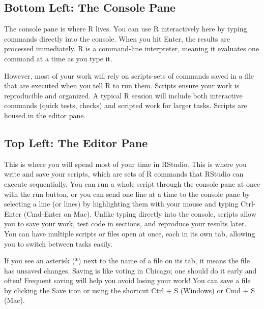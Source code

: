 \documentclass[
  letterpaper,
]{book}
\begin{document}
\subsection{Bottom Left: The Console
Pane}\label{bottom-left-the-console-pane}

The console pane is where R lives. You can use R interactively here by
typing commands directly into the console. When you hit Enter, the
results are processed immediately. R is a command-line interpreter,
meaning it evaluates one command at a time as you type it.

However, most of your work will rely on scripts-sets of commands saved
in a file that are executed when you tell R to run them. Scripts ensure
your work is reproducible and organized. A typical R session will
include both interactive commands (quick tests, checks) and scripted
work for larger tasks. Scripts are housed in the editor pane.

\subsection{Top Left: The Editor Pane}\label{top-left-the-editor-pane}

This is where you will spend most of your time in RStudio. This is where
you write and save your scripts, which are sets of R commands that
RStudio can execute sequentially. You can run a whole script through the
console pane at once with the run button, or you can send one line at a
time to the console pane by selecting a line (or lines) by highlighting
them with your mouse and typing Ctrl-Enter (Cmd-Enter on Mac). Unlike
typing directly into the console, scripts allow you to save your work,
test code in sections, and reproduce your results later. You can have
multiple scripts or files open at once, each in its own tab, allowing
you to switch between tasks easily.

\begin{tcolorbox}[enhanced jigsaw, colframe=quarto-callout-tip-color-frame, breakable, arc=.35mm, bottomtitle=1mm, bottomrule=.15mm, colbacktitle=quarto-callout-tip-color!10!white, rightrule=.15mm, colback=white, opacityback=0, opacitybacktitle=0.6, coltitle=black, left=2mm, toptitle=1mm, toprule=.15mm, titlerule=0mm, leftrule=.75mm, title=\textcolor{quarto-callout-tip-color}{\faLightbulb}\hspace{0.5em}{Tip from the Helpdesk: Files Don't Save Themselves}]

If you see an asterisk (*) next to the name of a file on its tab, it
means the file has unsaved changes. Saving is like voting in Chicago;
one should do it early and often! Frequent saving will help you avoid
losing your work! You can save a file by clicking the Save icon or using
the shortcut Ctrl + S (Windows) or Cmd + S (Mac).

\end{tcolorbox}
\end{document}
